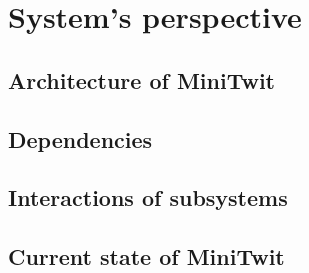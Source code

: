 \section{System's perspective}
\subsection{Architecture of MiniTwit}


\subsection{Dependencies}


\subsection{Interactions of subsystems}


\subsection{Current state of MiniTwit}
